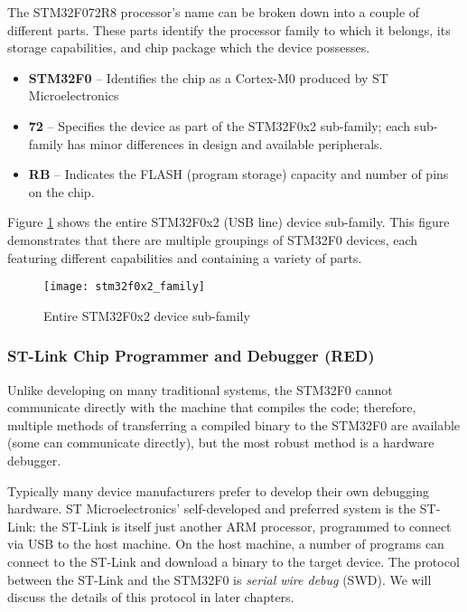 \documentclass[openany,11pt,fleqn]{book} %
\begin{document}
The STM32F072R8 processor's name can be broken down into a couple of different parts. These parts identify the processor family to which it belongs, its storage capabilities, and chip package which the device possesses.

\begin{itemize}
    \item \textbf{STM32F0} -- Identifies the chip as a Cortex-M0 produced by ST Microelectronics
    \item \textbf{72} -- Specifies the device as part of the STM32F0x2 sub-family; each sub-family has minor differences in design and available peripherals.
    \item \textbf{RB} -- Indicates the FLASH (program storage) capacity and number of pins on the chip.  
\end{itemize} 
Figure \ref{f072_family} shows the entire STM32F0x2 (USB line) device sub-family. This figure demonstrates that there are multiple groupings of STM32F0 devices, each featuring different capabilities and containing a variety of parts.

\begin{figure}[]
	\centering\texttt{[image: stm32f0x2\_family]}
	\caption{Entire STM32F0x2 device sub-family}
	\label{f072_family}
\end{figure}

\subsubsection*{ST-Link Chip Programmer and Debugger ({\color{red!90!black}RED})}
Unlike developing on many traditional systems, the STM32F0 cannot communicate directly with the machine that compiles the code; therefore, multiple methods of transferring a compiled binary to the STM32F0 are available (some can communicate directly), but the most robust method is a hardware debugger.

Typically many device manufacturers prefer to develop their own debugging hardware. ST Microelectronics' self-developed and preferred system is the ST-Link: the ST-Link is itself just another ARM processor, programmed to connect via USB to the host machine. On the host machine, a number of programs can connect to the ST-Link and download a binary to the target device. The protocol between the ST-Link and the STM32F0 is \textit{serial wire debug} (SWD).  We will discuss the details of this protocol in later chapters.
\end{document}
